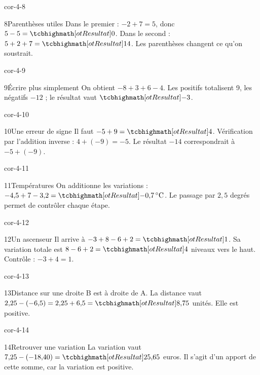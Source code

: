 \begin{blocLivre}{cor-4-8}\begin{corrige}{8}{Parenthèses utiles}
Dans le premier : $-2+7=5$, donc $5-5=\res0$. Dans le second : $5+2+7=\res{14}$. Les parenthèses changent ce qu’on soustrait.
\end{corrige}\end{blocLivre}
\begin{blocLivre}{cor-4-9}\begin{corrige}{9}{Écrire plus simplement}
On obtient $-8+3+6-4$. Les positifs totalisent 9, les négatifs $-12$ ; le résultat vaut $\res{-3}$.
\end{corrige}\end{blocLivre}
\begin{blocLivre}{cor-4-10}\begin{corrige}{10}{Une erreur de signe}
Il faut $-5+9=\res4$. Vérification par l’addition inverse : $4+(-9)=-5$. Le résultat $-14$ correspondrait à $-5+(-9)$.
\end{corrige}\end{blocLivre}
\begin{blocLivre}{cor-4-11}\begin{corrige}{11}{Températures}
On additionne les variations : $-4{,}5+7-3{,}2=\res{-0{,}7\,^\circ\mathrm C}$. Le passage par $2{,}5$ degrés permet de contrôler chaque étape.
\end{corrige}\end{blocLivre}
\begin{blocLivre}{cor-4-12}\begin{corrige}{12}{Un ascenseur}
Il arrive à $-3+8-6+2=\res1$. Sa variation totale est $8-6+2=\res4$ niveaux vers le haut. Contrôle : $-3+4=1$.
\end{corrige}\end{blocLivre}
\begin{blocLivre}{cor-4-13}\begin{corrige}{13}{Distance sur une droite}
B est à droite de A. La distance vaut $2{,}25-(-6{,}5)=2{,}25+6{,}5=\res{8{,}75}$ unités. Elle est positive.
\label{fig-cor-4-13}
\end{corrige}\end{blocLivre}
\begin{blocLivre}{cor-4-14}\begin{corrige}{14}{Retrouver une variation}
La variation vaut $7{,}25-(-18{,}40)=\res{25{,}65}$ euros. Il s’agit d’un apport de cette somme, car la variation est positive.
\end{corrige}\end{blocLivre}
